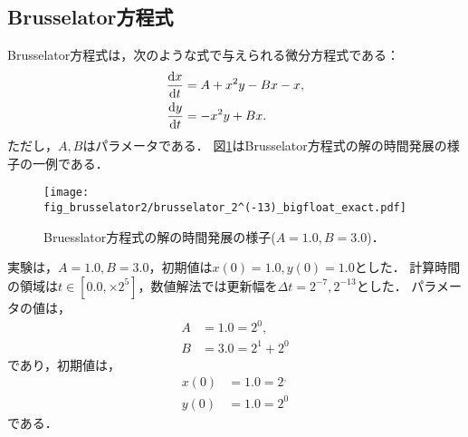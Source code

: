 \subsection{Brusselator方程式}
Brusselator方程式は，次のような式で与えられる微分方程式である：
\begin{align*}
    \frac{\mathrm{d}x}{\mathrm{d}t} &= A + x^2y - Bx - x,\\
    \frac{\mathrm{d}y}{\mathrm{d}t} &= -x^2y + Bx.
\end{align*}
ただし，$A,B$はパラメータである．
図\ref{fig:brusselator}はBrusselator方程式の解の時間発展の様子の一例である．
\begin{figure}[H]
    \centering
    \begin{minipage}[b]{0.9\columnwidth}
            \texttt{[image: fig\_brusselator2/brusselator\_2^(-13)\_bigfloat\_exact.pdf]}
    \end{minipage}
    \caption{Bruesslator方程式の解の時間発展の様子($A=1.0, B=3.0$)．}
    \label{fig:brusselator}
\end{figure}
実験は，$A=1.0, B=3.0$，初期値は$x(0) = 1.0, y(0) = 1.0$とした．
計算時間の領域は$t \in [0.0, \times 2^5]$，数値解法では更新幅を$\Delta t =  2^{-7}, 2^{-13}$とした．
パラメータの値は，
\begin{align*}
    A &= 1.0 = 2^0, \\
    B &= 3.0 = 2^1 + 2^0
\end{align*}
であり，初期値は，
\begin{align*}
    x(0) &= 1.0 = 2^, \\
    y(0) &= 1.0 = 2^0
\end{align*} 
である．
